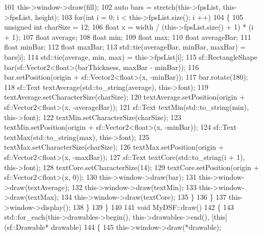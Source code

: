 \begin{DoxyCodeInclude}
101             this->window->draw(fill);
102             \textcolor{keyword}{auto} bars = stretch(this->fpsList, this->fpsList, height);
103             \textcolor{keywordflow}{for}(\textcolor{keywordtype}{int} i = 0; i < this->fpsList.size(); i ++)
104             \{
105                 \textcolor{keywordtype}{unsigned} \textcolor{keywordtype}{int} charSize = 12;
106                 \textcolor{keywordtype}{float} x = width / (this->fpsList.size() + 1) * (i + 1);
107                 \textcolor{keywordtype}{float} average;
108                 \textcolor{keywordtype}{float} min;
109                 \textcolor{keywordtype}{float} max;
110                 \textcolor{keywordtype}{float} averageBar;
111                 \textcolor{keywordtype}{float} minBar;
112                 \textcolor{keywordtype}{float} maxBar;
113                 std::tie(averageBar, minBar, maxBar) = bars[i];
114                 std::tie(average, min, max) = this->fpsList[i];
115                 sf::RectangleShape bar(sf::Vector2<float>(barThickness, maxBar - minBar));
116                 bar.setPosition(origin + sf::Vector2<float>(x, -minBar));
117                 bar.rotate(180);
118                 sf::Text textAverage(std::to\_string(average), this->font);
119                 textAverage.setCharacterSize(charSize);
120                 textAverage.setPosition(origin + sf::Vector2<float>(x, -averageBar));
121                 sf::Text textMin(std::to\_string(min), this->font);
122                 textMin.setCharacterSize(charSize);
123                 textMin.setPosition(origin + sf::Vector2<float>(x, -minBar));
124                 sf::Text textMax(std::to\_string(max), this->font);
125                 textMax.setCharacterSize(charSize);
126                 textMax.setPosition(origin + sf::Vector2<float>(x, -maxBar));
127                 sf::Text textCore(std::to\_string(i + 1), this->font);
128                 textCore.setCharacterSize(14);
129                 textCore.setPosition(origin + sf::Vector2<float>(x, 0));
130                 this->window->draw(bar);
131                 this->window->draw(textAverage);
132                 this->window->draw(textMin);
133                 this->window->draw(textMax);
134                 this->window->draw(textCore);
135             \}
136         \}
137         this->window->display();
138     \}
139 \}
140 
141 \textcolor{keywordtype}{void} MyDSF::draw()
142 \{
143     std::for\_each(this->drawables->begin(), this->drawables->end(), [\textcolor{keyword}{this}](sf::Drawable* drawable)
144                   \{
145                       this->window->draw(*drawable);

\end{DoxyCodeInclude}
